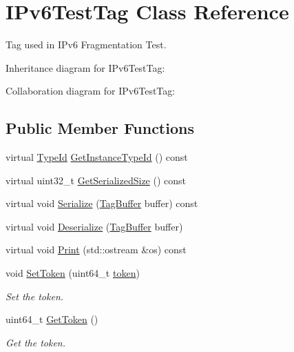 \hypertarget{classIPv6TestTag}{}\section{I\+Pv6\+Test\+Tag Class Reference}
\label{classIPv6TestTag}


Tag used in I\+Pv6 Fragmentation Test.  




Inheritance diagram for I\+Pv6\+Test\+Tag\+:


Collaboration diagram for I\+Pv6\+Test\+Tag\+:
\subsection*{Public Member Functions}
\begin{DoxyCompactItemize}
\item 
virtual \hyperlink{classns3_1_1TypeId}{Type\+Id} \hyperlink{classIPv6TestTag_a1e718e1640e6c7c494df06fdc6ae7407}{Get\+Instance\+Type\+Id} () const 
\item 
virtual uint32\+\_\+t \hyperlink{classIPv6TestTag_a2c749ba6a3f8bb0dcd2f75b126c117c3}{Get\+Serialized\+Size} () const 
\item 
virtual void \hyperlink{classIPv6TestTag_abb9d4e39f278061cc1c952b6752312d7}{Serialize} (\hyperlink{classns3_1_1TagBuffer}{Tag\+Buffer} buffer) const 
\item 
virtual void \hyperlink{classIPv6TestTag_a526dea351ae6171dab24c809c189ebb1}{Deserialize} (\hyperlink{classns3_1_1TagBuffer}{Tag\+Buffer} buffer)
\item 
virtual void \hyperlink{classIPv6TestTag_accd7c074ca3a77470e7bdc4a364177c5}{Print} (std\+::ostream \&os) const 
\item 
void \hyperlink{classIPv6TestTag_aeeafdd9d12f0d9f4ed4cc124f5729858}{Set\+Token} (uint64\+\_\+t \hyperlink{classIPv6TestTag_aac2a8bc52b978c8673d80fd98f5948a0}{token})
\begin{DoxyCompactList}\small\item\em Set the token. \end{DoxyCompactList}\item 
uint64\+\_\+t \hyperlink{classIPv6TestTag_a768de709cd124098db46ac1ae0f5a9b8}{Get\+Token} ()
\begin{DoxyCompactList}\small\item\em Get the token. \end{DoxyCompactList}\end{DoxyCompactItemize}
